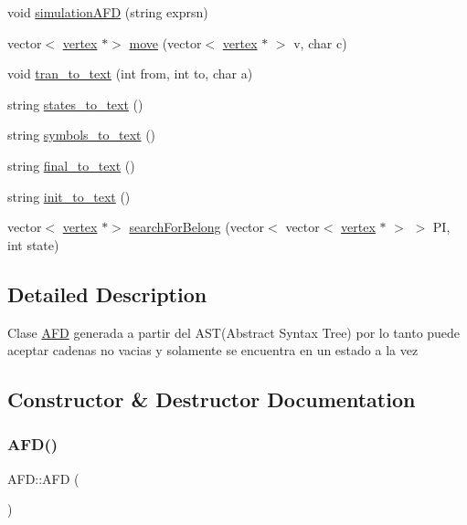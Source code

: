 \begin{DoxyCompactItemize}
\item 
void \hyperlink{class_a_f_d_a536493b9063f9e9c4eb734d3560f7a7d}{simulation\+A\+FD} (string exprsn)
\item 
vector$<$ \hyperlink{structvertex}{vertex} $\ast$$>$ \hyperlink{class_a_f_d_a4505bb76534ae8c4df01c164912f5c52}{move} (vector$<$ \hyperlink{structvertex}{vertex} $\ast$ $>$ v, char c)
\item 
void \hyperlink{class_a_f_d_a5c2a7a1aeb7fc4acba6ad6dd12603112}{tran\+\_\+to\+\_\+text} (int from, int to, char a)
\item 
string \hyperlink{class_a_f_d_a8c3da4d57cbc9bae76e775cb6b216d64}{states\+\_\+to\+\_\+text} ()
\item 
string \hyperlink{class_a_f_d_afee8c78c7a823e360e8e69136806e7c5}{symbols\+\_\+to\+\_\+text} ()
\item 
string \hyperlink{class_a_f_d_a6882d0942eceb2af40e8a1fe7c057d6e}{final\+\_\+to\+\_\+text} ()
\item 
string \hyperlink{class_a_f_d_ae2bf9a8a6511e585c911ff1c2416bb3e}{init\+\_\+to\+\_\+text} ()
\item 
vector$<$ \hyperlink{structvertex}{vertex} $\ast$$>$ \hyperlink{class_a_f_d_a894aafa23513f5b6dbdcbf3109281b4e}{search\+For\+Belong} (vector$<$ vector$<$ \hyperlink{structvertex}{vertex} $\ast$ $>$ $>$ PI, int state)
\end{DoxyCompactItemize}


\subsection{Detailed Description}
Clase \hyperlink{class_a_f_d}{A\+FD} generada a partir del A\+S\+T(\+Abstract Syntax Tree) por lo tanto puede aceptar cadenas no vacias y solamente se encuentra en un estado a la vez 

\subsection{Constructor \& Destructor Documentation}
\hypertarget{class_a_f_d_a69ad82d0fe1418e4c141649763a585a6}{}\label{class_a_f_d_a69ad82d0fe1418e4c141649763a585a6} 
\subsubsection{\texorpdfstring{A\+F\+D()}{AFD()}}
{\footnotesize\ttfamily A\+F\+D\+::\+A\+FD (\begin{DoxyParamCaption}{ }\end{DoxyParamCaption})}

